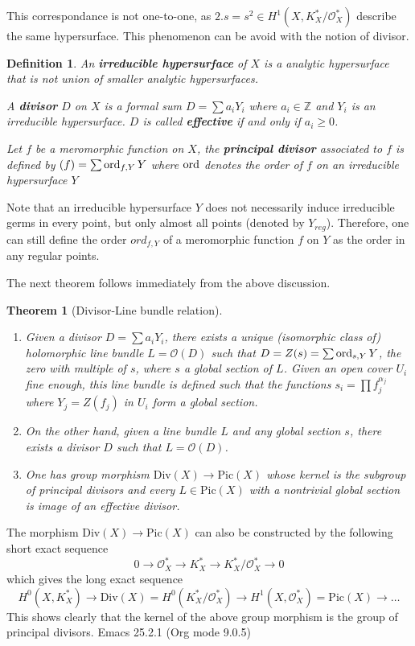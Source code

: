 \documentclass[11pt]{article}
\newtheorem{theorem}{Theorem}
\newtheorem{definition}{Definition}
\newcommand{\ord}{\mathop{\rm ord}\nolimits}
\begin{document}
This correspondance is not one-to-one, as \(2.s = s^2 \in H^1(X, K^*_X/\mathcal{O}_X^*)\) describe the same hypersurface. This phenomenon can be avoid with the notion of
divisor.

\begin{definition}
An \textbf{irreducible hypersurface} of \(X\) is a analytic hypersurface that is not union of
smaller analytic hypersurfaces.

A \textbf{divisor} \(D\) on \(X\) is a formal sum \(D = \sum a_i Y_i\) where \(a_i\in
\mathbb{Z}\) and \(Y_i\) is an irreducible hypersurface. \(D\) is called \textbf{effective}
if and only if \(a_i \geq 0\).

Let \(f\) be a meromorphic function on \(X\), the \textbf{principal divisor} associated to \(f\) is defined by \((f) = \sum \ord_{f,Y}Y\) where \(\ord\) denotes the order of \(f\) on an irreducible hypersurface \(Y\)
\end{definition}

Note that an irreducible hypersurface \(Y\) does not necessarily induce irreducible
germs in every point, but only almost all points (denoted by \(Y_{reg}\)). Therefore, one
can still define the order \(ord_{f,Y}\) of a meromorphic function \(f\) on \(Y\) as
the order in any regular points.

The next theorem follows immediately from the above discussion.
\begin{theorem}[Divisor-Line bundle relation]
\label{thm:div-pic-rel}
\begin{enumerate}
\item Given a divisor \(D = \sum a_i Y_i\), there exists a unique (isomorphic class of)
holomorphic line bundle \(L = \mathcal{O}(D)\) such that \(D =Z(s) = \sum \ord_{s,Y} Y\), the zero with
multiple of \(s\), where \(s\) a global section of \(L\). Given an open cover \(U_i\) fine enough, this line bundle is defined such that the functions \(s_i = \prod
   f_j^{\alpha_j}\) where \(Y_j = Z(f_j)\) in \(U_i\) form a global section.
\item On the other hand, given a line bundle \(L\) and any global section \(s\), there
exists a divisor \(D\) such that \(L = \mathcal{O}(D)\).
\item One has group morphism \(\text{Div}(X) \longrightarrow \text{Pic}(X)\) whose kernel
is the subgroup of principal divisors and every \(L\in \text{Pic}(X)\) with a
nontrivial global section is image of an effective divisor.
\end{enumerate}
\end{theorem}

The morphism \(\text{Div}(X) \longrightarrow \text{Pic}(X)\) can also be constructed by
the following short exact sequence
\[
0 \longrightarrow \mathcal{O}_X^* \longrightarrow K_X^* \longrightarrow K_X^*/
\mathcal{O}_X^* \longrightarrow 0
\]
which gives the long exact sequence
\[
H^0(X,K_X^*) \longrightarrow \text{Div}(X) = H^0(K_X^*/\mathcal{O}_X^*) \longrightarrow
H^1(X, \mathcal{O}_X^*) = \text{Pic}(X) \longrightarrow \dots
\]
This shows clearly that the kernel of the above group morphism is the group of principal divisors.
Emacs 25.2.1 (Org mode 9.0.5)
\end{document}
